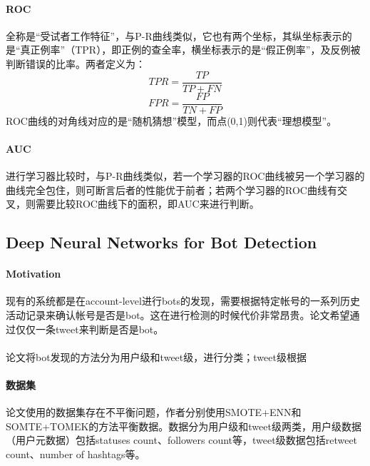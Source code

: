 \documentclass[10pt,letterpaper]{article}
\begin{document}
\paragraph{ROC} 全称是“受试者工作特征”，与P-R曲线类似，它也有两个坐标，其纵坐标表示的是“真正例率”（TPR），即正例的查全率，横坐标表示的是“假正例率”，及反例被判断错误的比率。两者定义为：\\
\begin{equation}
	TPR = \frac{TP}{TP + FN}
\end{equation}
\begin{equation}
	FPR = \frac{FP}{TN + FP}
\end{equation}
ROC曲线的对角线对应的是“随机猜想”模型，而点(0,1)则代表“理想模型”。

\paragraph{AUC} 进行学习器比较时，与P-R曲线类似，若一个学习器的ROC曲线被另一个学习器的曲线完全包住，则可断言后者的性能优于前者；若两个学习器的ROC曲线有交叉，则需要比较ROC曲线下的面积，即AUC来进行判断。



\subsection{Deep Neural Networks for Bot Detection\cite{kudugunta2018bot}}

\paragraph{Motivation} 现有的系统都是在account-level进行bots的发现，需要根据特定帐号的一系列历史活动记录来确认帐号是否是bot。这在进行检测的时候代价非常昂贵。论文希望通过仅仅一条tweet来判断是否是bot。

\paragraph{} 论文将bot发现的方法分为用户级和tweet级，进行分类；tweet级根据
\paragraph{数据集} 论文使用的数据集存在不平衡问题，作者分别使用SMOTE+ENN和SOMTE+TOMEK的方法平衡数据。数据分为用户级和tweet级两类，用户级数据（用户元数据）包括statuses count、followers count等，tweet级数据包括retweet count、number of hashtags等。




\end{document}
